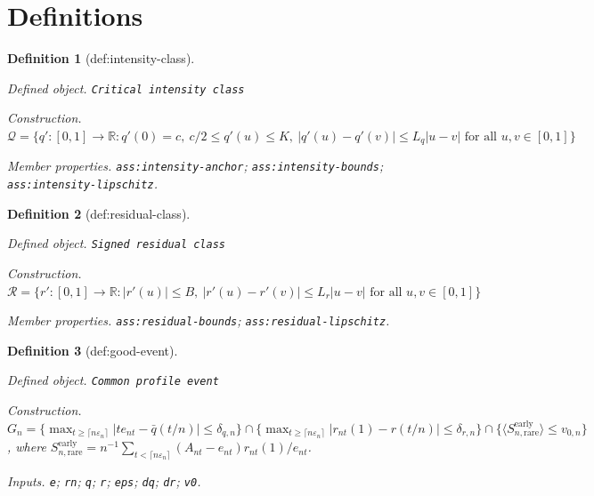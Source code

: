 \documentclass{article}
\newtheorem{definition}{Definition}
\begin{document}
\section{Definitions}

\begin{definition}[def:intensity-class]\label{def:intensity-class}
\par\smallskip\noindent\emph{Defined object.} \texttt{Critical intensity class}
\par\smallskip\noindent\emph{Construction.} \(\mathcal Q=\{q':[0,1]\to\mathbb R:q'(0)=c,\ c/2\le q'(u)\le K,\ |q'(u)-q'(v)|\le L_q|u-v|\text{ for all }u,v\in[0,1]\}\)
\par\smallskip\noindent\emph{Member properties.} \texttt{ass:\allowbreak{}intensity-\allowbreak{}anchor}; \texttt{ass:\allowbreak{}intensity-\allowbreak{}bounds}; \texttt{ass:\allowbreak{}intensity-\allowbreak{}lipschitz}.
\end{definition}

\begin{definition}[def:residual-class]\label{def:residual-class}
\par\smallskip\noindent\emph{Defined object.} \texttt{Signed residual class}
\par\smallskip\noindent\emph{Construction.} \(\mathcal R=\{r':[0,1]\to\mathbb R:|r'(u)|\le B,\ |r'(u)-r'(v)|\le L_r|u-v|\text{ for all }u,v\in[0,1]\}\)
\par\smallskip\noindent\emph{Member properties.} \texttt{ass:\allowbreak{}residual-\allowbreak{}bounds}; \texttt{ass:\allowbreak{}residual-\allowbreak{}lipschitz}.
\end{definition}

\begin{definition}[def:good-event]\label{def:good-event}
\par\smallskip\noindent\emph{Defined object.} \texttt{Common profile event}
\par\smallskip\noindent\emph{Construction.} \(G_n=\{\max_{t\ge\lceil n\varepsilon_n\rceil}|t e_{nt}-\bar q(t/n)|\le\delta_{q,n}\}\cap\{\max_{t\ge\lceil n\varepsilon_n\rceil}|r_{nt}(1)-r(t/n)|\le\delta_{r,n}\}\cap\{\langle S_{n,\mathrm{rare}}^{\mathrm{early}}\rangle\le v_{0,n}\}\), where \(S_{n,\mathrm{rare}}^{\mathrm{early}}=n^{-1}\sum_{t<\lceil n\varepsilon_n\rceil}(A_{nt}-e_{nt})r_{nt}(1)/e_{nt}\).
\par\smallskip\noindent\emph{Inputs.} \texttt{e}; \texttt{rn}; \texttt{q}; \texttt{r}; \texttt{eps}; \texttt{dq}; \texttt{dr}; \texttt{v0}.
\end{definition}
\end{document}
